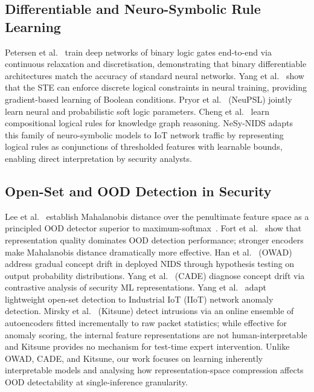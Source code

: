 \documentclass[journal]{IEEEtran}
\begin{document}
\subsection{Differentiable and Neuro-Symbolic Rule Learning}

Petersen et al.~\cite{petersen2022logic} train deep networks of binary
logic gates end-to-end via continuous relaxation and discretisation,
demonstrating that binary differentiable architectures match the
accuracy of standard neural networks.
Yang et al.~\cite{yang2022ste} show that the STE can enforce discrete
logical constraints in neural training, providing gradient-based
learning of Boolean conditions.
Pryor et al.~\cite{pryor2023neupsl} (NeuPSL) jointly learn neural and
probabilistic soft logic parameters.
Cheng et al.~\cite{cheng2023ncrl} learn compositional logical rules for
knowledge graph reasoning.
NeSy-NIDS adapts this family of neuro-symbolic models to IoT network
traffic by representing logical rules as conjunctions of thresholded
features with learnable bounds, enabling direct interpretation by
security analysts.

\subsection{Open-Set and OOD Detection in Security}

Lee et al.~\cite{lee2018simple} establish Mahalanobis distance over the
penultimate feature space as a principled OOD detector superior to
maximum-softmax~\cite{hendrycks2017baseline}.
Fort et al.~\cite{fort2021exploring} show that representation quality
dominates OOD detection performance; stronger encoders make Mahalanobis
distance dramatically more effective.
Han et al.~\cite{han2023owad} (OWAD) address gradual concept drift in
deployed NIDS through hypothesis testing on output probability
distributions.
Yang et al.~\cite{yang2021cade} (CADE) diagnose concept drift via
contrastive analysis of security ML representations.
Yang et al.~\cite{yang2025openset} adapt lightweight open-set detection
to Industrial IoT (IIoT) network anomaly detection.
Mirsky et al.~\cite{mirsky2018kitsune} (Kitsune) detect intrusions via
an online ensemble of autoencoders fitted incrementally to raw packet
statistics; while effective for anomaly scoring, the internal feature
representations are not human-interpretable and Kitsune provides no
mechanism for test-time expert intervention.
Unlike OWAD, CADE, and Kitsune, our work focuses on learning inherently
interpretable models and analysing how representation-space compression
affects OOD detectability at single-inference granularity.
\end{document}
